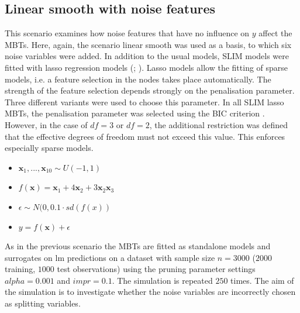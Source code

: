 \subsection{Linear smooth with noise features}
This scenario examines how noise features that have no influence on $y$ affect the MBTs. Here, again, the scenario linear smooth was used as a basis, to which six noise variables were added.
In addition to the usual models, SLIM models were fitted with lasso regression models (\citealp{Tibshirani.1996};  \citealp{Friedman.2010}). Lasso models allow the fitting of sparse models, i.e. a feature selection in the nodes takes place automatically. The strength of the feature selection depends strongly on the penalisation parameter. Three different variants were used to choose this parameter. In all SLIM lasso MBTs, the penalisation parameter was selected using the BIC criterion \citep{Sabourin.2015}. However, in the case of $df = 3$ or $df = 2$, the additional restriction was defined that the effective degrees of freedom must not exceed this value. This enforces especially sparse models.

\begin{itemize}
    \item $\textbf{x}_1,..., \textbf{x}_{10} \sim U(-1,1)$
    \item $ f(\textbf{x}) = \textbf{x}_1 + 4   \textbf{x}_2 + 3   \textbf{x}_2   \textbf{x}_3 $
    \item $\epsilon \sim N(0, 0.1 \cdot sd(f(x))$
    \item $y = f(\textbf{x}) + \epsilon$
\end{itemize}


As in the previous scenario the MBTs are fitted as standalone models and surrogates on lm predictions on a dataset with sample size $ n = 3000$ ($2000$ training, $1000$ test observations) using the pruning parameter settings $alpha = 0.001$ and $impr = 0.1$. The simulation is repeated $250$ times.
The aim of the simulation is to investigate whether the noise variables are incorrectly chosen as splitting variables.

